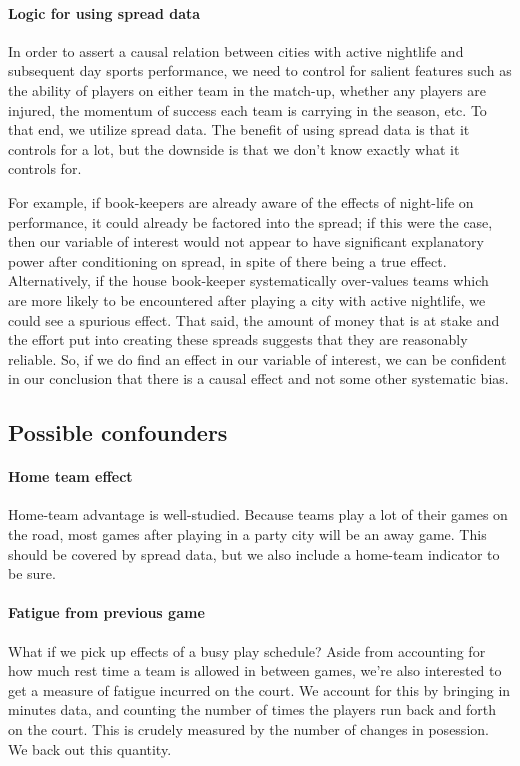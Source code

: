 \documentclass[letterpaper,12pt]{article}
\begin{document}
\paragraph{Logic for using spread data}
In order to assert a causal relation between cities with active nightlife 
and subsequent day sports performance, we need to control for salient
features such as the ability of players on either team in the match-up,
whether any players are injured, the momentum of success each team is carrying
in the season, etc.\cite{anderson} To that end, we utilize spread data. The benefit of
using spread data is that it controls for a lot, but the downside is that
we don't know exactly what it controls for.

For example, if book-keepers
are already aware of the effects of night-life on performance, it could
already be factored into the spread; if this were the case, then our variable
of interest would not appear to have significant explanatory power
after conditioning on spread, in spite of there being
a true effect. Alternatively,
if the house book-keeper systematically over-values
teams which are more likely to be encountered after playing a city with active nightlife,
we could see a spurious effect. 
That said, the amount of money that is at stake and the effort put into creating these spreads 
suggests that they are reasonably reliable. 
So, if we do find an effect in our variable of interest,
we can be confident in our conclusion that there is a causal effect and not some 
other systematic bias.

\subsection{Possible confounders}

\paragraph{Home team effect}
Home-team advantage is well-studied.\cite{jones07, jones08}  
Because teams play a lot of their games on the road,
most games after playing in a party city will be an away game.
This should be covered by spread data, but we also include
a home-team indicator to be sure.

\paragraph{Fatigue from previous game}
What if we pick up effects of a busy play schedule?
Aside from accounting for how much rest time a team is allowed in between games,
we're also interested to get a measure of
fatigue incurred on the court.
We account for this by bringing in minutes data, and counting the number of 
times the players run back and forth on the court. This is crudely measured
by the number of changes in posession. We back out this quantity.
\end{document}
